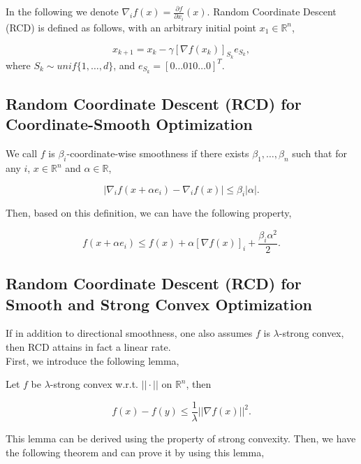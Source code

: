 \documentclass[12pt]{report}
\begin{document}
In the following we denote $\nabla_i f(x) = \frac{\partial f}{\partial x_i}(x).$ Random Coordinate Descent (RCD) is defined as follows, with an arbitrary initial point $x_1 \in \mathbb{R}^n$,

$$x_{k+1} = x_{k} - \gamma [\nabla f(x_k)]_{S_k} e_{S_k},$$
where $S_k \sim unif\{1,\dots,d\}$, and $e_{S_k} =[0 \dots 0 1 0 \dots 0]^T .$





\vspace{1cm}
\subsection{Random Coordinate Descent (RCD) for Coordinate-Smooth Optimization}

We call $f$ is $\beta_i$-coordinate-wise smoothness if there exists $\beta_1, \dots, \beta_n$ such that for any $i$, $x \in \mathbb{R}^n$ and $\alpha \in \mathbb{R}$, 

$$|\nabla_i f(x+\alpha e_i)- \nabla_i f(x)| \leq \beta_i |\alpha|.$$

Then, based on this definition, we can have the following property,

$$f(x+\alpha e_i) \leq f(x) +\alpha [\nabla f(x)]_i + \frac{\beta_i \alpha^2}{2}.$$






\vspace{1cm}
\subsection{Random Coordinate Descent (RCD) for Smooth and Strong Convex Optimization}

If in addition to directional smoothness, one also assumes $f$ is $\lambda$-strong convex, then RCD attains in fact a linear rate.\\

First, we introduce the following lemma,
\begin{lemma}

Let $f$ be $\lambda$-strong convex w.r.t. $||\cdot||$ on $\mathbb{R}^n$, then 

$$f(x) - f(y) \leq \frac{1}{\lambda} ||\nabla f(x)||^2.$$

\end{lemma}

This lemma can be derived using the property of strong convexity. Then, we have the following theorem and can prove it by using this lemma, 
\end{document}
